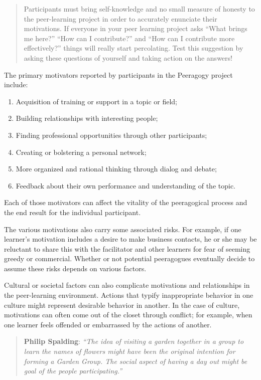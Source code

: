 \begin{quote}
Participants must bring self-knowledge and no small measure of honesty
to the peer-learning project in order to accurately enunciate their
motivations. If everyone in your peer learning project asks ``What
brings me here?'' ``How can I contribute?'' and ``How can I contribute
more effectively?'' things will really start percolating. Test this
suggestion by asking these questions of yourself and taking action on
the answers!
\end{quote}
The primary motivators reported by participants in the Peeragogy project
include:

\begin{enumerate}
\item
  Acquisition of training or support in a topic or field;
\item
  Building relationships with interesting people;
\item
  Finding professional opportunities through other participants;
\item
  Creating or bolstering a personal network;
\item
  More organized and rational thinking through dialog and debate;
\item
  Feedback about their own performance and understanding of the topic.
\end{enumerate}
Each of those motivators can affect the vitality of the peeragogical
process and the end result for the individual participant.

The various motivations also carry some associated risks. For example,
if one learner's motivation includes a desire to make business contacts,
he or she may be reluctant to share this with the facilitator and other
learners for fear of seeming greedy or commercial. Whether or not
potential peeragogues eventually decide to assume these risks depends on
various factors.

Cultural or societal factors can also complicate motivations and
relationships in the peer-learning environment. Actions that typify
inappropriate behavior in one culture might represent desirable behavior
in another. In the case of culture, motivations can often come out of
the closet through conflict; for example, when one learner feels
offended or embarrassed by the actions of another.

\begin{quote}
\textbf{Philip Spalding}: \emph{``The idea of visiting a garden together
in a group to learn the names of flowers might have been the original
intention for forming a Garden Group. The social aspect of having a day
out might be goal of the people participating.''}
\end{quote}

